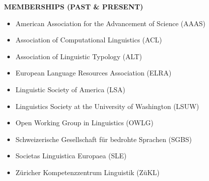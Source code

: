 \documentclass[11pt]{article}
\begin{document}
\vskip 10pt
\begin{flushleft}
{\bf MEMBERSHIPS (PAST \& PRESENT)}
\end{flushleft}
\begin{itemize}
\item American Association for the Advancement of Science (AAAS)
\item Association of Computational Linguistics (ACL)
\item Association of Linguistic Typology (ALT)
\item European Language Resources Association (ELRA)
\item Linguistic Society of America (LSA)
\item Linguistics Society at the University of Washington (LSUW)
\item Open Working Group in Linguistics (OWLG)
\item Schweizerische Gesellschaft f{\"u}r bedrohte Sprachen (SGBS)
\item Societas Linguistica Europaea (SLE)
\item Z{\"u}richer Kompetenzzentrum Linguistik (Z{\"u}KL)
\end{itemize}
\end{document}
